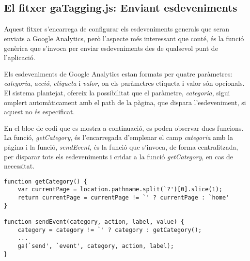 \subsection{El fitxer gaTagging.js: Enviant esdeveniments}

    \paragraph{}
    Aquest fitxer s'encarrega de configurar els esdeveniments generals que seran en\-vi\-ats a Google Analytics, però l'aspecte més interessant que conté, és la funció genèrica que s'invoca per enviar esdeveniments des de qualsevol punt de l'aplicació.

    Els esdeveniments de Google Analytics estan formats per quatre paràmetres: \emph{categoria}, \emph{acció}, \emph{etiqueta} i \emph{valor}, on els paràmetres etiqueta i valor són opcionals. El sistema plantejat, ofereix la possibilitat que el paràmetre, \emph{categoria}, sigui omplert automàticament amb el path de la pàgina, que dispara l'esdeveniment, si aquest no és especificat.

    En el bloc de codi que es mostra a continuació, es poden observar dues funcions. La funció, \emph{getCategory}, és l'encarregada d'emplenar el camp \emph{categoria} amb la pàgina i la funció, \emph{sendEvent}, és la funció que s'invoca, de forma centralitzada, per disparar tots els esdeveniments i cridar a la funció \emph{getCategory}, en cas de necessitat.

    \begin{lstlisting}[style=rawOwn,caption={Funcions que controlen l'enviament d'esdeveniments a GA}]
function getCategory() {
    var currentPage = location.pathname.split(`?')[0].slice(1);
    return currentPage = currentPage != `' ? currentPage : `home'
}

function sendEvent(category, action, label, value) {
    category = category != `' ? category : getCategory();
    ...
    ga(`send', `event', category, action, label);
}
    \end{lstlisting}
